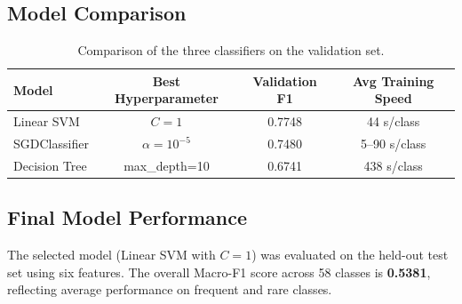 \documentclass{article}
\begin{document}
\subsection{Model Comparison}
\begin{table}[h]
\centering
\begin{tabular}{lccc}
\toprule
\textbf{Model} & \textbf{Best Hyperparameter} & \textbf{Validation F1} & \textbf{Avg Training Speed} \\
\midrule
Linear SVM     & $C=1$                        & 0.7748                & 44 s/class             \\
SGDClassifier  & $\alpha=10^{-5}$             & 0.7480                & 5–90 s/class            \\
Decision Tree  & max\_depth=10                & 0.6741                & 438 s/class             \\
\bottomrule
\end{tabular}
\caption{Comparison of the three classifiers on the validation set.}
\end{table}

\subsection{Final Model Performance}
The selected model (Linear SVM with $C=1$) was evaluated on the held-out test set using six features.
The overall Macro-F1 score across 58 classes is \textbf{0.5381}, reflecting average performance on frequent and rare classes.
\end{document}
